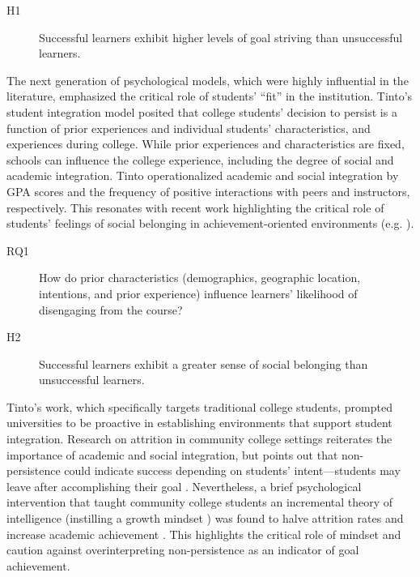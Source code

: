 \documentclass{sigchi}\usepackage[]{graphicx}\usepackage[]{color}
\begin{document}
\begin{description}
  \item[H1] Successful learners exhibit higher levels of goal striving than unsuccessful learners.
\end{description}

The next generation of psychological models, which were highly influential in the literature, emphasized the critical role of students' ``fit'' in the institution. Tinto's \citeyear{tinto1975dropout} student integration model posited that college students' decision to persist is a function of prior experiences and individual students' characteristics, and experiences during college. While prior experiences and characteristics are fixed, schools can influence the college experience, including the degree of social and academic integration. Tinto operationalized academic and social integration by GPA scores and the frequency of positive interactions with peers and instructors, respectively. This resonates with recent work highlighting the critical role of students' feelings of social belonging in achievement-oriented environments (e.g. \cite{walton2007question}). 

\begin{description}
  \item[RQ1] How do prior characteristics (demographics, geographic location, intentions, and prior experience) influence learners' likelihood of disengaging from the course?
  \item[H2] Successful learners exhibit a greater sense of social belonging than unsuccessful learners.
\end{description}

Tinto's work, which specifically targets traditional college students, prompted universities to be proactive in establishing environments that support student integration. Research on attrition in community college settings reiterates the importance of academic and social integration, but points out that non-persistence could indicate success depending on students' intent---students may leave after accomplishing their goal \cite{bers1991persistence}. Nevertheless, a brief psychological intervention that taught community college students an incremental theory of intelligence (instilling a growth mindset \cite{dweck2006mindset}) was found to halve attrition rates and increase academic achievement \cite{paunesku2012brief}. This highlights the critical role of mindset and caution against overinterpreting non-persistence as an indicator of goal achievement.
\end{document}
